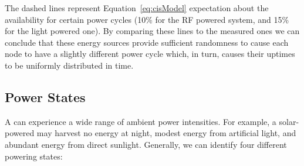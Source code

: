 The dashed lines represent Equation~\ref{eq:cisModel} expectation about the \sys availability for certain power cycles (10\% for the RF powered system, and 15\% for the light powered one). By comparing these lines to the measured ones we can conclude that these energy sources provide sufficient randomness to cause each node to have a slightly different power cycle which, in turn, causes their uptimes to be uniformly distributed in time.  


\subsection{Power States}
\label{sec:power_state}
A \sys can experience a wide range of ambient power intensities. For example, a solar-powered \sys may harvest no energy at night, modest energy from artificial light, and abundant energy from direct sunlight.  Generally, we can identify four different \sys powering states: 
